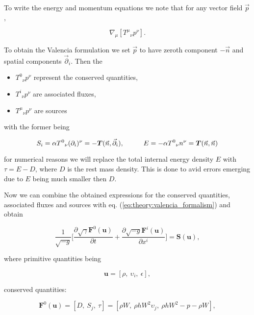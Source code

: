 \documentclass[11pt,a4paper,headinclude=true,DIV=14,BCOR=8mm,chapterprefix,listof=totoc,twoside,openright,abstracton]{scrbook}
\begin{document}
To write the energy and momentum equations we note that for any vector field $\vec{p} $ \cite{Rezzolla:2013}, 

\begin{equation}
    \nabla_{\mu}[{T^{\mu}}_{\nu}p^{\nu}].
\end{equation}

To obtain the Valencia formulation we set $\vec{p}$ to have zeroth component $-\vec{n}$ and spatial components $\vec{\partial}_i$. Then the

\begin{itemize}
    \item ${T^0}_{\nu}p^{\nu}$ represent the conserved quantities,
    \item ${T^i}_{\nu}p^{\nu}$ are associated fluxes,
    \item ${T^{\mu}}_{\nu}p^{\nu}$ are sources
\end{itemize}

with the former being 

\begin{equation}
    S_{i} = \alpha {T^0}_{\nu}(\partial_i)^{\nu}=-\boldsymbol{T}(\vec{n},\vec{\partial}_i), \hspace{10mm} E = -\alpha{T^0}_{\nu}n^{\nu} = \boldsymbol{T}(\vec{n},\vec{n})
\end{equation}

for numerical reasons we will replace the total internal energy density $E$ with $\tau = E-D$, where $D$ is the rest mass density. This is done to avid errors emerging due to $E$ being much smaller then $D$. 

Now we can combine the obtained expressions for the conserved quantities, associated fluxes and sources with eq. (\ref{eq:theory:valencia_formalism}) and obtain

\begin{equation}
    \frac{1}{\sqrt{-g}}\Big[\frac{\partial\sqrt{\gamma}\boldsymbol{F}^{0}(\boldsymbol{u})}{\partial t} + \frac{\partial\sqrt{-g}\boldsymbol{F}^{i}(\boldsymbol{u})}{\partial x^i}\Big] = \boldsymbol{S}(\boldsymbol{u}),
\end{equation}

where primitive quantities being

\begin{equation}
    \boldsymbol{u} = [\rho,\: \upsilon_i,\: \epsilon],
\end{equation}

conserved quantities: 

\begin{equation}
    \boldsymbol{F}^0(\boldsymbol{u}) = [D,\: S_j,\: \tau] = [\rho W,\: \rho h W^2 \upsilon_j,\: \rho h W^2 - p - \rho W],
\end{equation}
\end{document}
